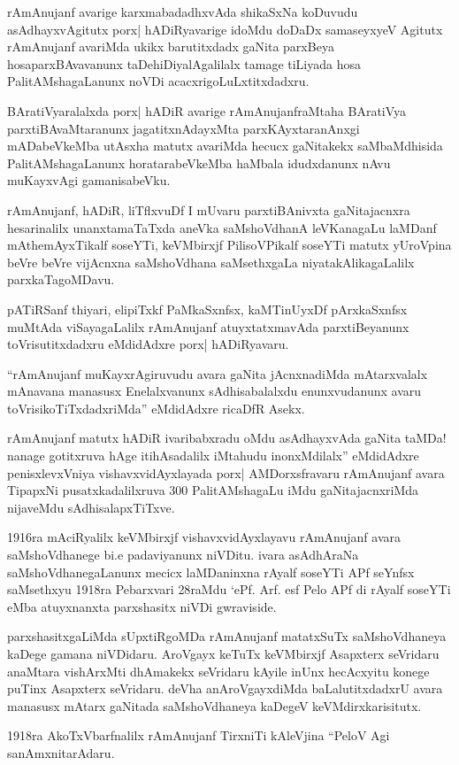 rAmAnujanf avarige karxmabadadhxvAda shikaSxNa koDuvudu asAdhayxvAgitutx
porx| hADiRyavarige idoMdu doDaDx samaseyxyeV Agitutx rAmAnujanf avariMda ukikx barutitxdadx gaNita parxBeya hosaparxBAvavanunx taDehiDiyalAgalilalx tamage tiLiyada hosa PalitAMshagaLanunx noVDi acacxrigoLuLxtitxdadxru.

BAratiVyaralalxda porx| hADiR avarige rAmAnujanfraMtaha BAratiVya parxtiBAvaMtaranunx jagatitxnAdayxMta parxKAyxtaranAnxgi mADabeVkeMba utAsxha matutx avariMda hecucx gaNitakekx saMbaMdhisida PalitAMshagaLanunx horatarabeVkeMba haMbala idudxdanunx nAvu muKayxvAgi gamanisabeVku.

rAmAnujanf, hADiR, liTflxvuDf I mUvaru parxtiBAnivxta gaNitajacnxra hesarinalilx unanxtamaTaTxda aneVka saMshoVdhanA leVKanagaLu laMDanf mAthemAyxTikalf soseYTi, keVMbirxjf PilisoVPikalf soseYTi matutx yUroVpina beVre beVre vijAcnxna saMshoVdhana saMsethxgaLa niyatakAlikagaLalilx parxkaTagoMDavu.

pATiRSanf thiyari, elipiTxkf PaMkaSxnfsx, kaMTinUyxDf pArxkaSxnfsx muMtAda viSayagaLalilx rAmAnujanf atuyxtatxmavAda parxtiBeyanunx toVrisutitxdadxru eMdidAdxre porx| hADiRyavaru.

``rAmAnujanf muKayxrAgiruvudu avara gaNita jAcnxnadiMda mAtarxvalalx mAnavana manasusx Enelalxvanunx sAdhisabalalxdu enunxvudanunx avaru toVrisikoTiTxdadxriMda'' eMdidAdxre ricaDfR Asekx.

rAmAnujanf matutx hADiR ivaribabxradu oMdu asAdhayxvAda gaNita taMDa! nanage gotitxruva hAge itihAsadalilx iMtahudu inonxMdilalx'' eMdidAdxre penisxlevxVniya vishavxvidAyxlayada porx| AMDorxsfravaru rAmAnujanf avara TipapxNi pusatxkadalilxruva {\rm 300} PalitAMshagaLu iMdu gaNitajacnxriMda nijaveMdu sAdhisalapxTiTxve.

{\rm 1916}ra mAciRyalilx keVMbirxjf vishavxvidAyxlayavu rAmAnujanf avara saMshoVdhanege bi.e padaviyanunx niVDitu. ivara asAdhAraNa saMshoVdhanegaLanunx mecicx laMDaninxna rAyalf soseYTi APf seYnfsx saMsethxyu {\rm 1918}ra Pebarxvari {\rm 28}raMdu `ePf. Arf. esf Pelo APf di rAyalf soseYTi eMba atuyxnanxta parxshasitx niVDi gwraviside.

parxshasitxgaLiMda sUpxtiRgoMDa rAmAnujanf matatxSuTx saMshoVdhaneya kaDege gamana niVDidaru. AroVgayx keTuTx keVMbirxjf Asapxterx seVridaru anaMtara vishArxMti dhAmakekx seVridaru kAyile inUnx hecAcxyitu konege puTinx Asapxterx seVridaru. deVha anAroVgayxdiMda baLalutitxdadxrU avara manasusx mAtarx gaNitada saMshoVdhaneya kaDegeV keVMdirxkarisitutx.

{\rm 1918}ra AkoTxVbarfnalilx rAmAnujanf TirxniTi kAleVjina ``PeloV Agi sanAmxnitarAdaru.

